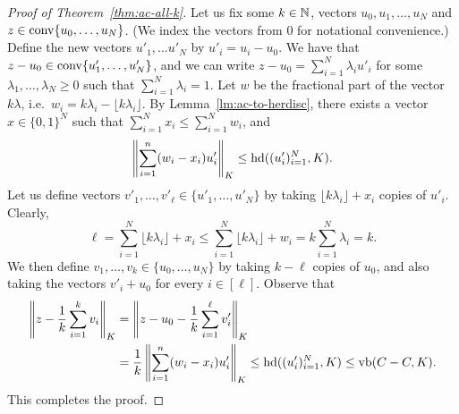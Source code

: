 \begin{proof}[Proof of Theorem~\ref{thm:ac-all-k}]
  Let us fix some $k \in {\mathbb{N}}$, vectors $u_0, u_1, \ldots, u_N$ and $z
  \in \operatorname{conv}\{u_0, \ldots, u_N\}$. (We index the vectors from $0$ for
  notational convenience.) Define the new vectors $u'_1, \ldots u'_N$
  by $u'_i = u_i - u_0$. We have that $z - u_0 \in \operatorname{conv}\{u_1',
  \ldots, u_N'\}$, and we can write $z - u_0 = \sum_{i =
    1}^N{\lambda_i u'_i}$ for some $\lambda_1, \ldots, \lambda_N \ge
  0$ such that $\sum_{i = 1}^N{\lambda_i} = 1$. Let $w$ be the fractional
  part of the vector $k\lambda$, i.e.~$w_i = k\lambda_i - \lfloor
  k\lambda_i \rfloor$. By Lemma~\ref{lm:ac-to-herdisc}, there exists a
  vector $x \in \{0,1\}^N$ such that  $\sum_{i = 1}^N{x_i} \le \sum_{i = 1}^N{w_i}$, and
  \[
  \left\|\sum_{i = 1}^n(w_i - x_i)u'_i\right\|_K \le \operatorname{hd}((u'_i)_{i =  1}^N, K).
  \]
  Let us define vectors $v'_1, \ldots, v'_\ell \in \{u'_1, \ldots,
  u'_N\}$ by taking $\lfloor  k\lambda_i\rfloor + x_i$ copies of
  $u'_i$. Clearly,
  \[
  \ell = \sum_{i = 1}^N{\lfloor k\lambda_i\rfloor + x_i} \le \sum_{i
    = 1}^N{\lfloor k\lambda_i\rfloor + w_i}  = k\sum_{i =
    1}^N{\lambda_i} = k.
  \]
  We then define $v_1, \ldots, v_k \in \{u_0, \ldots, u_N\}$ by taking
  $k-\ell$ copies of $u_0$, and also taking the vectors $v'_i + u_0$
  for every $i
  \in [\ell]$.  Observe that
  \begin{align*}
    \left\|z - \frac1k \sum_{i = 1}^k{v_i}\right\|_K
    &= 
    \left\|z -u_0 - \frac1k \sum_{i = 1}^\ell{v'_i}\right\|_K\\
    &= \frac{1}{k} \left\|\sum_{i = 1}^n(w_i - x_i)u'_i\right\|_K
    \le \operatorname{hd}((u'_i)_{i = 1}^N, K) \le \operatorname{vb}(C - C, K).
  \end{align*}
  This completes the proof. 
\end{proof}